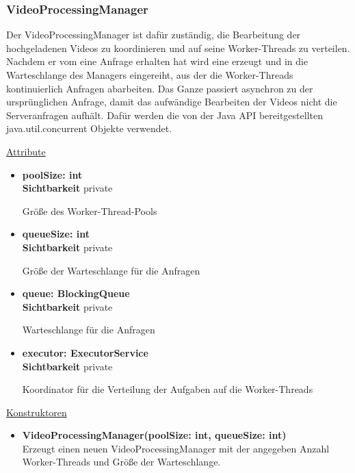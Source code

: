 \subsubsection{VideoProcessingManager} \label{service:klasse:VideoProcessingManager}
Der VideoProcessingManager ist dafür zuständig, die Bearbeitung der hochgeladenen Videos zu koordinieren und auf seine Worker-Threads zu verteilen. Nachdem er vom  eine Anfrage erhalten hat wird eine  erzeugt und in die Warteschlange des Managers eingereiht, aus der die Worker-Threads kontinuierlich Anfragen abarbeiten. Das Ganze passiert asynchron zu der ursprünglichen Anfrage, damit das aufwändige Bearbeiten der Videos nicht die Serveranfragen aufhält. Dafür werden die von der Java API bereitgestellten java.util.concurrent Objekte verwendet. \newline

\underline{Attribute}
\begin{itemize}
\itemsep0pt
\item \textbf{poolSize: int} \hfill\\ 
\textbf{Sichtbarkeit} private

Größe des Worker-Thread-Pools

\item \textbf{queueSize: int} \hfill\\ 
\textbf{Sichtbarkeit} private

Größe der Warteschlange für die Anfragen

\item \textbf{queue: BlockingQueue} \hfill\\
\textbf{Sichtbarkeit} private 

Warteschlange für die Anfragen

\item \textbf{executor: ExecutorService} \hfill\\ 
\textbf{Sichtbarkeit} private

Koordinator für die Verteilung der Aufgaben auf die Worker-Threads
\end{itemize}

\underline{Konstruktoren}
\begin{itemize}
\itemsep0pt
\item \textbf{VideoProcessingManager(poolSize: int, queueSize: int)} \hfill\\
Erzeugt einen neuen VideoProcessingManager mit der angegeben Anzahl Worker-Threads und Größe der Warteschlange.
\end{itemize}

